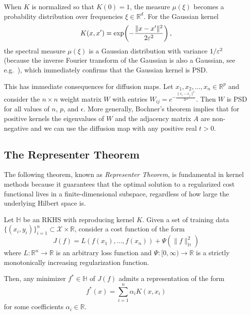 \medskip
When $K$ is normalized so that $K(0) = 1$, the measure $\mu(\xi)$ becomes a probability distribution over frequencies $\xi \in \mathbb{R}^d$. For the Gaussian kernel
$$    K(x, x') = \exp\!\left(-\frac{\|x - x'\|^2}{2\varepsilon^2}\right),
$$
the spectral measure $\mu(\xi)$ is a Gaussian distribution with variance $1/\varepsilon^2$ (because the inverse Fourier transform of the Gaussian is also a Gaussian, see e.g.~\cite[Lemma 1.5.1]{Gro01}), which immediately confirms that the Gaussian kernel is PSD.

This  has immediate consequences for diffusion maps. Let $x_1,x_2,\ldots, x_n \in \mathbb{R}^p$ and consider the $n\times n$ weight matrix $W$ with entries
$
W_{ij} = e^{-\frac{\|x_i - x_j \|^2}{2\epsilon^2}}$.
Then $W$ is PSD for all values of $n$, $p$, and $\epsilon$. More generally,  Bochner's theorem implies that for positive kernels the eigenvalues of $W$ and the adjacency matrix $A$ are non-negative and we can use the diffusion map with any positive real $t>0$.

\subsection{The Representer Theorem}

The following theorem, known as {\em Representer Theorem}, is fundamental in kernel methods because it guarantees that the optimal solution to a regularized cost functional lives in a finite-dimensional subspace, regardless of how large the underlying Hilbert space is.


\begin{theorem}\label{th:representer}
Let $\mathbb{H}$ be an RKHS with reproducing kernel $K$. 
Given a set of training data $\{(x_i, y_i)\}_{i=1}^n \subset \mathcal{X} \times \mathbb{R}$, consider a cost function of the form
$$J(f) = L(f(x_1), \dots, f(x_n)) + \Psi(\|f\|_{\mathbb{H}}^2)$$
where $L: \mathbb{R}^n \to \mathbb{R}$ is an arbitrary loss function and $\Psi: [0, \infty) \to \mathbb{R}$ is a strictly monotonically increasing regularization function.

Then, any minimizer $f^* \in \mathbb{H}$ of $J(f)$ admits a representation of the form
$$f^*(x) = \sum_{i=1}^n \alpha_i K(x, x_i)$$
for some coefficients $\alpha_i \in \mathbb{R}$.
\end{theorem}

